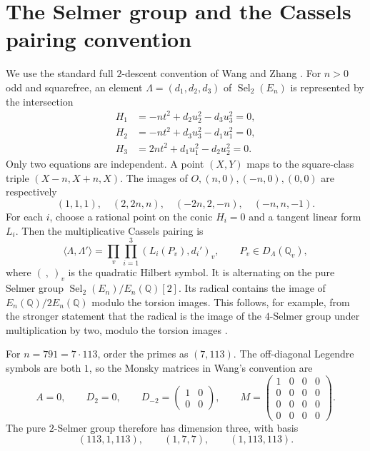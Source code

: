 \documentclass[11pt,a4paper]{article}
\newcommand{\Q}{\mathbb Q}
\begin{document}
\section{The Selmer group and the Cassels pairing convention}
We use the standard full $2$-descent convention of Wang \cite[Sections 2.1--2.2]{W} and Zhang \cite[Sections 2.1--2.2]{Z}. For $n>0$ odd and squarefree, an element $\Lambda=(d_1,d_2,d_3)$ of $\operatorname{Sel}_2(E_n)$ is represented by the intersection
\begin{align*}
 H_1&=-nt^2+d_2u_2^2-d_3u_3^2=0,\\
 H_2&=-nt^2+d_3u_3^2-d_1u_1^2=0,\\
 H_3&=2nt^2+d_1u_1^2-d_2u_2^2=0.
\end{align*}
Only two equations are independent. A point $(X,Y)$ maps to the square-class triple $(X-n,X+n,X)$. The images of $O,(n,0),(-n,0),(0,0)$ are respectively
\begin{equation}\label{eq:torsion}
 (1,1,1),\quad (2,2n,n),\quad(-2n,2,-n),\quad(-n,n,-1).
\end{equation}
For each $i$, choose a rational point on the conic $H_i=0$ and a tangent linear form $L_i$. Then the multiplicative Cassels pairing is
\begin{equation}\label{eq:pairing}
 \langle\Lambda,\Lambda'\rangle
 =\prod_v\prod_{i=1}^3 (L_i(P_v),d_i')_v,
 \qquad P_v\in D_\Lambda(\Q_v),
\end{equation}
where $(\ ,\ )_v$ is the quadratic Hilbert symbol. It is alternating on the pure Selmer group $\operatorname{Sel}_2(E_n)/E_n(\Q)[2]$. Its radical contains the image of $E_n(\Q)/2E_n(\Q)$ modulo the torsion images. This follows, for example, from the stronger statement that the radical is the image of the $4$-Selmer group under multiplication by two, modulo the torsion images \cite[Section 2.2]{W}.

For $n=791=7\cdot113$, order the primes as $(7,113)$. The off-diagonal Legendre symbols are both $1$, so the Monsky matrices in Wang's convention are
\[
 A=0,\qquad D_2=0,\qquad D_{-2}=\begin{pmatrix}1&0\\0&0\end{pmatrix},
 \qquad
 M=\begin{pmatrix}1&0&0&0\\0&0&0&0\\0&0&0&0\\0&0&0&0\end{pmatrix}.
\]
The pure $2$-Selmer group therefore has dimension three, with basis
\begin{equation}\label{eq:basis}
 (113,1,113),\qquad (1,7,7),\qquad(1,113,113).
\end{equation}
\end{document}
